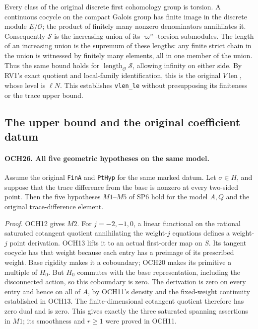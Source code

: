 \documentclass[11pt,a4paper]{article}
\numberwithin{equation}{section}
\theoremstyle{remark}\newtheorem{remark}[theorem]{Remark}
\begin{document}
Every class of the original discrete first cohomology group is
torsion.  A continuous cocycle on the compact Galois group has
finite image in the discrete module \(E/\mathcal O\); the
product of finitely many nonzero denominators annihilates it.
Consequently \(\mathcal S\) is the increasing union of its
\(\varpi^n\)-torsion submodules.  The length of an increasing
union is the supremum of these lengths: any finite strict chain
in the union is witnessed by finitely many elements, all in one
member of the union.  Thus the same bound holds for
\(\operatorname{length}_{\mathcal O}\mathcal S\), allowing
infinity on either side.  By RV1's exact quotient and local-family
identification, this is the original
\(V\!\operatorname{len}\), whose level is \(\ell N\).
This establishes \texttt{vlen\_\allowbreak le} without presupposing its
finiteness or the trace upper bound.

\subsection{The upper bound and the original coefficient datum}

\paragraph{OCH26. All five geometric hypotheses on the same model.}
\label{claim:OCH26}
Assume the original \texttt{Fin\allowbreak A} and \texttt{Pt\allowbreak Hyp} for the
same marked datum.  Let \(\sigma\in H\), and suppose that
the trace difference from the base is nonzero at every two-sided
point.  Then the five hypotheses \(M1\)--\(M5\) of SP6 hold
for the model \(A,Q\) and the original trace-difference element.

\emph{Proof.}
OCH12 gives \(M2\).  For \(j=-2,-1,0\), a linear
functional on the rational saturated cotangent quotient annihilating
the weight-\(j\) equations defines a weight-\(j\) point
derivation.  OCH13 lifts it to an actual first-order map on
\(S\).  Its tangent cocycle has that weight because each entry
has a preimage of its prescribed weight.  Base rigidity makes it
a coboundary; OCH20 makes its primitive a multiple of \(H_0\).
But \(H_0\) commutes with the base representation, including
the disconnected action, so this coboundary is zero.  The
derivation is zero on every entry and hence on all of \(A\),
by OCH11's density and the fixed-weight continuity established in
OCH13.  The finite-dimensional cotangent quotient therefore has
zero dual and is zero.  This gives exactly the three saturated
spanning assertions in \(M1\); its smoothness and \(r\ge1\)
were proved in OCH11.
\end{document}

